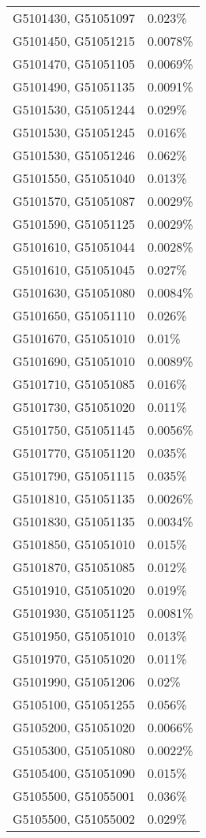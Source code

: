 \begin{longtable}[]{@{}ll@{}}
G5101430, G51051097 & 0.023\% \\
G5101450, G51051215 & 0.0078\% \\
G5101470, G51051105 & 0.0069\% \\
G5101490, G51051135 & 0.0091\% \\
G5101530, G51051244 & 0.029\% \\
G5101530, G51051245 & 0.016\% \\
G5101530, G51051246 & 0.062\% \\
G5101550, G51051040 & 0.013\% \\
G5101570, G51051087 & 0.0029\% \\
G5101590, G51051125 & 0.0029\% \\
G5101610, G51051044 & 0.0028\% \\
G5101610, G51051045 & 0.027\% \\
G5101630, G51051080 & 0.0084\% \\
G5101650, G51051110 & 0.026\% \\
G5101670, G51051010 & 0.01\% \\
G5101690, G51051010 & 0.0089\% \\
G5101710, G51051085 & 0.016\% \\
G5101730, G51051020 & 0.011\% \\
G5101750, G51051145 & 0.0056\% \\
G5101770, G51051120 & 0.035\% \\
G5101790, G51051115 & 0.035\% \\
G5101810, G51051135 & 0.0026\% \\
G5101830, G51051135 & 0.0034\% \\
G5101850, G51051010 & 0.015\% \\
G5101870, G51051085 & 0.012\% \\
G5101910, G51051020 & 0.019\% \\
G5101930, G51051125 & 0.0081\% \\
G5101950, G51051010 & 0.013\% \\
G5101970, G51051020 & 0.011\% \\
G5101990, G51051206 & 0.02\% \\
G5105100, G51051255 & 0.056\% \\
G5105200, G51051020 & 0.0066\% \\
G5105300, G51051080 & 0.0022\% \\
G5105400, G51051090 & 0.015\% \\
G5105500, G51055001 & 0.036\% \\
G5105500, G51055002 & 0.029\% \\

\end{longtable}
